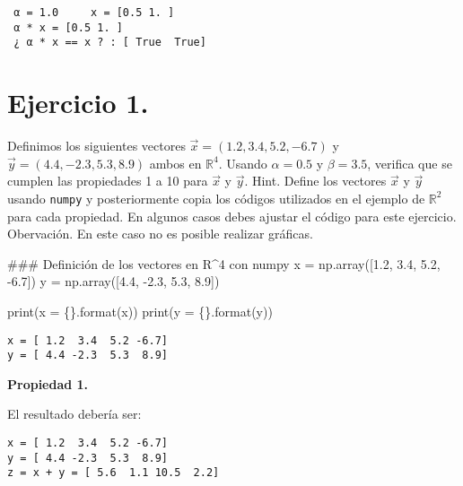\documentclass[
  letterpaper,
  DIV=11,
  numbers=noendperiod]{scrreprt}
\newenvironment{Shaded}{\begin{snugshade}}{\end{snugshade}}
\newcommand{\BuiltInTok}[1]{\textcolor[rgb]{0.00,0.23,0.31}{#1}}
\newcommand{\CommentTok}[1]{\textcolor[rgb]{0.37,0.37,0.37}{#1}}
\newcommand{\FloatTok}[1]{\textcolor[rgb]{0.68,0.00,0.00}{#1}}
\newcommand{\NormalTok}[1]{\textcolor[rgb]{0.00,0.23,0.31}{#1}}
\newcommand{\OperatorTok}[1]{\textcolor[rgb]{0.37,0.37,0.37}{#1}}
\newcommand{\SpecialCharTok}[1]{\textcolor[rgb]{0.37,0.37,0.37}{#1}}
\newcommand{\StringTok}[1]{\textcolor[rgb]{0.13,0.47,0.30}{#1}}
\begin{document}
\begin{verbatim}
 α = 1.0     x = [0.5 1. ]
 α * x = [0.5 1. ]
 ¿ α * x == x ? : [ True  True]
\end{verbatim}

\section{\texorpdfstring{\textbf{Ejercicio
1.}}{Ejercicio 1.}}\label{ejercicio-1.}

Definimos los siguientes vectores \(\vec{x} = (1.2, 3.4, 5.2, -6.7)\) y
\(\vec{y} = (4.4, -2.3, 5.3, 8.9)\) ambos en \(\mathbb{R}^4\). Usando
\(\alpha = 0.5\) y \(\beta = 3.5\), verifica que se cumplen las
propiedades 1 a 10 para \(\vec{x}\) y \(\vec{y}\). Hint. Define los
vectores \(\vec{x}\) y \(\vec{y}\) usando \texttt{numpy} y
posteriormente copia los códigos utilizados en el ejemplo de
\(\mathbb{R}^2\) para cada propiedad. En algunos casos debes ajustar el
código para este ejercicio. Obervación. En este caso no es posible
realizar gráficas.

\begin{Shaded}
\begin{Highlighting}[]
\CommentTok{\#\#\# Definición de los vectores en R\^{}4 con numpy}
\NormalTok{x }\OperatorTok{=}\NormalTok{ np.array([}\FloatTok{1.2}\NormalTok{, }\FloatTok{3.4}\NormalTok{, }\FloatTok{5.2}\NormalTok{, }\OperatorTok{{-}}\FloatTok{6.7}\NormalTok{])}
\NormalTok{y }\OperatorTok{=}\NormalTok{ np.array([}\FloatTok{4.4}\NormalTok{, }\OperatorTok{{-}}\FloatTok{2.3}\NormalTok{, }\FloatTok{5.3}\NormalTok{, }\FloatTok{8.9}\NormalTok{])}

\BuiltInTok{print}\NormalTok{(}\StringTok{\textquotesingle{}x = }\SpecialCharTok{\{\}}\StringTok{\textquotesingle{}}\NormalTok{.}\BuiltInTok{format}\NormalTok{(x))}
\BuiltInTok{print}\NormalTok{(}\StringTok{\textquotesingle{}y = }\SpecialCharTok{\{\}}\StringTok{\textquotesingle{}}\NormalTok{.}\BuiltInTok{format}\NormalTok{(y))}
\end{Highlighting}
\end{Shaded}

\begin{verbatim}
x = [ 1.2  3.4  5.2 -6.7]
y = [ 4.4 -2.3  5.3  8.9]
\end{verbatim}

\textbf{Propiedad 1.}

El resultado debería ser:

\begin{verbatim}
x = [ 1.2  3.4  5.2 -6.7]
y = [ 4.4 -2.3  5.3  8.9]
z = x + y = [ 5.6  1.1 10.5  2.2]
\end{verbatim}
\end{document}

